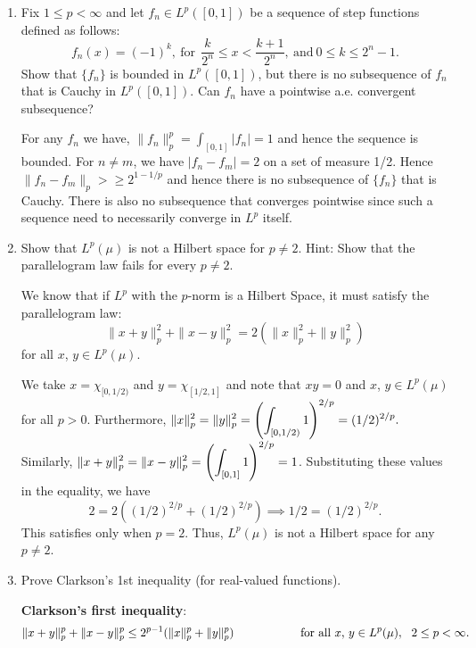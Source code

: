 \documentclass[12pt]{article}
\begin{document}
\begin{enumerate}
    \item Fix $1 \leq p < \infty$ and let $f_n \in L^p([0,1])$ be a sequence of step functions defined as follows:
    $$f_n (x) = (-1)^k, \ \text{for} \ \  \frac{k}{2^n} \leq x < \frac{k+1}{2^n}, \ \text{and}\ 0 \leq k \leq 2^n -1.$$ 
    Show that $\{f_n\}$ is bounded in $L^p([0,1])$, but there is no subsequence of $f_n$ that is Cauchy in $L^p([0,1])$. Can $f_n$ have a pointwise a.e. convergent subsequence?
    \begin{mybox}
        For any $f_n$ we have, $\|f_n\|^p_p=
        \int_{[0,1]}{|f_n|}=1$ and hence the sequence is
        bounded. For $n\neq m$, we have $|f_n-f_m|=2$ on
        a set of measure 1/2. Hence $\|f_n-f_m\|_p>\geq
        2^{1-1/p}$ and hence there is no subsequence
        of $\{f_n\}$ that is Cauchy. There is also no
        subsequence that converges pointwise since such
        a sequence need to necessarily converge in
        $L^p$ itself.
    \end{mybox}
    
    \item Show that $L^p(\mu)$ is not a Hilbert space for $p \neq 2$. Hint: Show that the parallelogram law fails for every $p \neq 2$.
    \begin{mybox}
        We know that if $L^p$ with the $p$-norm is a Hilbert Space, it must satisfy
        the parallelogram law:
        $$\|x+y\|^2_p+\|x-y\|^2_p=2(\|x\|^2_p+\|y\|^2_p)$$
        for all $x$, $y\in L^p(\mu)$.

        \vspace*{2mm}
        We take $x=\chi_{[0,1/2)}$ and $y=\chi_{[1/2,1]}$
        and note that $xy=0$ and $x$, $y\in L^p(\mu)$
        for all $p>0$. Furthermore, $\displaystyle \|x\|^2_p=\|y\|^2_p=
        \left(\int_{[0,1/2)}{1}\right)^{2/p}=(1/2)^{2/p}.$
        Similarly, $\displaystyle \|x+y\|^2_p=\|x-y\|^2_p=
        \left(\int_{[0,1]}{1}\right)^{2/p}=1$. Substituting
        these values in the equality, we have
        $$2=2((1/2)^{2/p}+(1/2)^{2/p})
        \implies 1/2=(1/2)^{2/p}.$$
        This satisfies only when $p=2$. Thus, $L^p(\mu)$ is
        not a Hilbert space for any $p\neq 2$.
    \end{mybox}

    \item Prove Clarkson's 1st inequality (for real-valued functions).
    \begin{mybox}
        \textbf{Clarkson's first inequality}:
        $$\|x+y\|^p_p+\|x-y\|^p_p\leq 2^{p-1}(\|x\|^p_p+\|y\|^p_p)
        \hspace*{20mm}\text{for all $x$, $y\in L^p(\mu)$},\ \ 2\leq p<\infty.$$


\end{mybox}
\end{enumerate}
\end{document}
